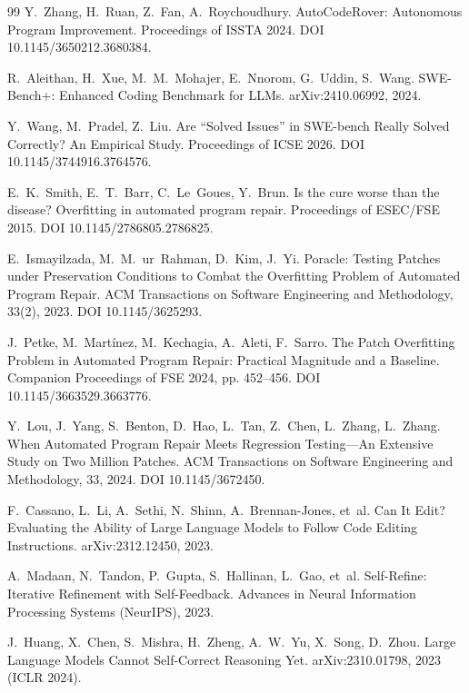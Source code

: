 \begin{thebibliography}{99}
 Y.~Zhang, H.~Ruan, Z.~Fan, A.~Roychoudhury.
AutoCodeRover: Autonomous Program Improvement.
Proceedings of ISSTA 2024. DOI 10.1145/3650212.3680384.

 R.~Aleithan, H.~Xue, M.~M.~Mohajer, E.~Nnorom, G.~Uddin, S.~Wang.
SWE-Bench+: Enhanced Coding Benchmark for LLMs.
arXiv:2410.06992, 2024.

 Y.~Wang, M.~Pradel, Z.~Liu.
Are ``Solved Issues'' in SWE-bench Really Solved Correctly? An Empirical Study.
Proceedings of ICSE 2026. DOI 10.1145/3744916.3764576.

 E.~K.~Smith, E.~T.~Barr, C.~Le~Goues, Y.~Brun.
Is the cure worse than the disease? Overfitting in automated program repair.
Proceedings of ESEC/FSE 2015. DOI 10.1145/2786805.2786825.

 E.~Ismayilzada, M.~M.~ur~Rahman, D.~Kim, J.~Yi.
Poracle: Testing Patches under Preservation Conditions to Combat the Overfitting Problem of Automated Program Repair.
ACM Transactions on Software Engineering and Methodology, 33(2), 2023. DOI 10.1145/3625293.

 J.~Petke, M.~Mart\'inez, M.~Kechagia, A.~Aleti, F.~Sarro.
The Patch Overfitting Problem in Automated Program Repair: Practical Magnitude and a Baseline.
Companion Proceedings of FSE 2024, pp. 452--456. DOI 10.1145/3663529.3663776.

 Y.~Lou, J.~Yang, S.~Benton, D.~Hao, L.~Tan, Z.~Chen, L.~Zhang, L.~Zhang.
When Automated Program Repair Meets Regression Testing---An Extensive Study on Two Million Patches.
ACM Transactions on Software Engineering and Methodology, 33, 2024. DOI 10.1145/3672450.

 F.~Cassano, L.~Li, A.~Sethi, N.~Shinn, A.~Brennan-Jones, et~al.
Can It Edit? Evaluating the Ability of Large Language Models to Follow Code Editing Instructions.
arXiv:2312.12450, 2023.

 A.~Madaan, N.~Tandon, P.~Gupta, S.~Hallinan, L.~Gao, et~al.
Self-Refine: Iterative Refinement with Self-Feedback.
Advances in Neural Information Processing Systems (NeurIPS), 2023.

 J.~Huang, X.~Chen, S.~Mishra, H.~Zheng, A.~W.~Yu, X.~Song, D.~Zhou.
Large Language Models Cannot Self-Correct Reasoning Yet.
arXiv:2310.01798, 2023 (ICLR 2024).


\end{thebibliography}
